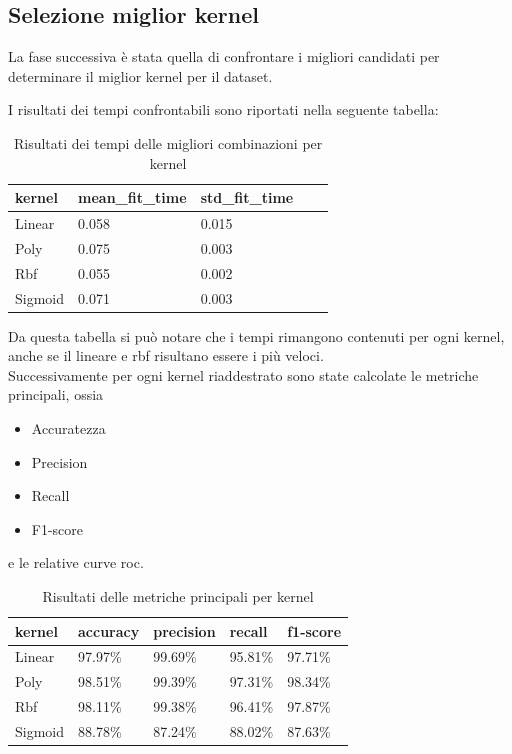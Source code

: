 \subsection{Selezione miglior kernel}
    La fase successiva è stata quella di confrontare i migliori candidati per
    determinare il miglior kernel per il dataset.
    
    I risultati dei tempi confrontabili sono riportati nella seguente tabella:

    \begin{table}[!ht]
        \centering
        \begin{tabular}{|l|l|l|l|l|}
        \hline
            \textbf{kernel} & \textbf{mean\_fit\_time} & \textbf{std\_fit\_time} \\ \hline
            Linear & 0.058 & 0.015  \\ \hline
            Poly & 0.075 & 0.003  \\ \hline
            Rbf & 0.055 & 0.002  \\ \hline
            Sigmoid & 0.071 & 0.003  \\ \hline
        \end{tabular}
        \caption{Risultati dei tempi delle migliori combinazioni per kernel}
        \label{tab:top_time_kernels_corr}
    \end{table}

    Da questa tabella si può notare che i tempi rimangono contenuti per ogni kernel,
    anche se il lineare e rbf risultano essere i più veloci.\\

    Successivamente per ogni kernel riaddestrato sono state calcolate 
    le metriche principali, ossia
    \begin{itemize}
        \item Accuratezza
        \item Precision
        \item Recall
        \item F1-score
    \end{itemize}
    e le relative curve roc.

    \begin{table}[!ht]
        \centering
        \begin{tabular}{|l|l|l|l|l|}
        \hline
            \textbf{kernel} & \textbf{accuracy} & \textbf{precision} & \textbf{recall} & \textbf{f1-score} \\ \hline
            Linear & 97.97\% & 99.69\% & 95.81\% & 97.71\%  \\ \hline
            Poly & 98.51\% & 99.39\% & 97.31\% & 98.34\%  \\ \hline
            Rbf & 98.11\% & 99.38\% & 96.41\% & 97.87\%  \\ \hline
            Sigmoid & 88.78\% & 87.24\% & 88.02\% & 87.63\%  \\ \hline
        \end{tabular}
        \caption{Risultati delle metriche principali per kernel}
        \label{tab:top_metrics_kernels_corr}
    \end{table}

